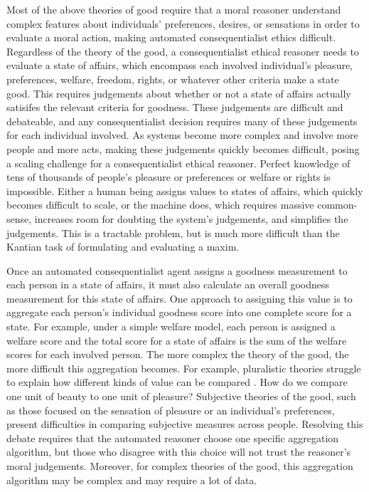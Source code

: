 \begin{isabellebody}
\begin{isamarkuptext}
Most of the above theories of good require that a moral reasoner understand complex features about
individuals' preferences, desires, or sensations in order to evaluate a moral action, making automated
consequentialist ethics difficult. Regardless of the theory of the good, a consequentialist ethical 
reasoner needs to evaluate a state of affairs, which encompass each involved individual's pleasure, 
preferences, welfare, freedom, rights, or whatever other criteria make a state good. This requires
judgements about whether or not a state of affairs actually satisifes the relevant criteria for goodness. 
These judgements are difficult and debateable, and any consequentialist decision requires many of 
these judgements for each individual involved. As systems become more complex and involve more people and 
more acts, making these judgements quickly becomes difficult, posing a scaling challenge for a 
consequentialist ethical reasoner. Perfect knowledge of tens of thousands of people's pleasure or 
preferences or welfare or rights is impossible. Either a human being 
assigns values to states of affairs, which quickly becomes difficult to scale, or the machine does, 
which requires massive common-sense, increases room for doubting the system's judgements, and simplifies
the judgements. This is a tractable problem, but is much more difficult than the Kantian task of formulating
and evaluating a maxim.%
\end{isamarkuptext}\isamarkuptrue%
%
\isadelimdocument
%
\endisadelimdocument
%
\isatagdocument
%
\isamarkuptrue%
%
\endisatagdocument
{\isafolddocument}%
%
\isadelimdocument
%
\endisadelimdocument
%
\begin{isamarkuptext}%
Once an automated consequentialist agent assigns a goodness measurement to each person in a state of affairs, it 
must also calculate an overall goodness measurement for this state of affairs. One approach to assigning
this value is to aggregate each person's individual goodness score into one complete score for a state. 
For example, under a simple welfare model, each person is assigned a welfare score and the total 
score for a state of affairs is the sum of the welfare scores for each involved person.
The more complex the theory of the good, the more difficult this aggregation becomes. For example, 
pluralistic theories struggle to explain how different kinds of value can be compared \cite{consequentialismsep}. 
How do we compare one unit of beauty to one unit of pleasure? Subjective theories of the good, such 
as those focused on the sensation of pleasure or an individual's preferences, present difficulties in 
comparing subjective measures across people. Resolving this debate requires that the automated reasoner 
choose one specific aggregation algorithm, but those who disagree with this choice will not trust 
the reasoner's moral judgements. Moreover, for complex theories of the good, this aggregation algorithm
may be complex and may require a lot of data. 


\end{isamarkuptext}
\end{isabellebody}

